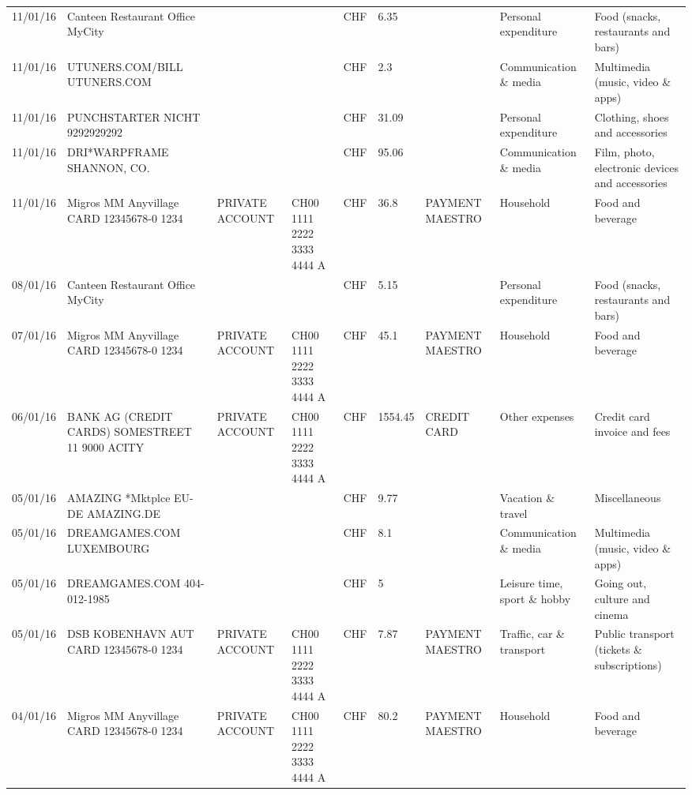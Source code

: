 \begin{landscape}
\begin{center}
\begin{longtable}{lllllllll}
		11/01/16 & Canteen Restaurant Office      MyCity &       &       & CHF   & 6.35  &       & Personal expenditure & Food (snacks, restaurants and bars) \\
		11/01/16 & UTUNERS.COM/BILL          UTUNERS.COM &       &       & CHF   & 2.3   &       & Communication \& media & Multimedia (music, video \& apps) \\
		11/01/16 & PUNCHSTARTER NICHT   9292929292 &       &       & CHF   & 31.09 &       & Personal expenditure & Clothing, shoes and accessories \\
		11/01/16 & DRI*WARPFRAME             SHANNON, CO. &       &       & CHF   & 95.06 &       & Communication \& media & Film, photo, electronic devices and accessories \\
		11/01/16 & Migros MM Anyvillage CARD 12345678-0 1234 & PRIVATE ACCOUNT & CH00 1111 2222 3333 4444 A & CHF   & 36.8  & PAYMENT MAESTRO & Household & Food and beverage \\
		08/01/16 & Canteen Restaurant Office      MyCity &       &       & CHF   & 5.15  &       & Personal expenditure & Food (snacks, restaurants and bars) \\
		07/01/16 & Migros MM Anyvillage CARD 12345678-0 1234 & PRIVATE ACCOUNT & CH00 1111 2222 3333 4444 A & CHF   & 45.1  & PAYMENT MAESTRO & Household & Food and beverage \\
		06/01/16 & BANK AG (CREDIT CARDS) SOMESTREET 11 9000 ACITY & PRIVATE ACCOUNT & CH00 1111 2222 3333 4444 A & CHF   & 1554.45 & CREDIT CARD & Other expenses & Credit card invoice and fees \\
		05/01/16 & AMAZING *Mktplce EU-DE    AMAZING.DE &       &       & CHF   & 9.77  &       & Vacation \& travel & Miscellaneous \\
		05/01/16 & DREAMGAMES.COM           LUXEMBOURG &       &       & CHF   & 8.1   &       & Communication \& media & Multimedia (music, video \& apps) \\
		05/01/16 & DREAMGAMES.COM           404-012-1985 &       &       & CHF   & 5     &       & Leisure time, sport \& hobby & Going out, culture and cinema \\
		05/01/16 & DSB KOBENHAVN AUT CARD 12345678-0 1234 & PRIVATE ACCOUNT & CH00 1111 2222 3333 4444 A & CHF   & 7.87  & PAYMENT MAESTRO & Traffic, car \& transport & Public transport (tickets \& subscriptions) \\
		04/01/16 & Migros MM Anyvillage CARD 12345678-0 1234 & PRIVATE ACCOUNT & CH00 1111 2222 3333 4444 A & CHF   & 80.2  & PAYMENT MAESTRO & Household & Food and beverage \\

\end{longtable}
\end{center}
\end{landscape}
